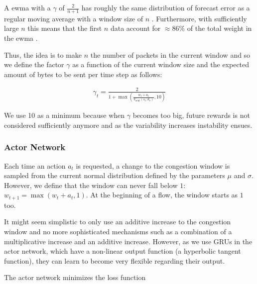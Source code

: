 \documentclass[sigconf]{acmart}
\newcommand\givenbase[1][]{\:#1\lvert\:}
\let\given\givenbase
\begin{document}
A ewma with a $\gamma$ of $\frac{2}{n+1}$ has roughly the same distribution of forecast error as a regular moving average with a window size of $n$ \cite{nahmias_production_2009}. Furthermore, with sufficiently large $n$ this means that the first $n$ data account for $\approx 86\%$ of the total weight in the ewma \cite{boissard_applications_2012}.

Thus, the idea is to make $n$ the number of packets in the current window and so we define the factor $\gamma$ as a function of the current window size and the expected amount of bytes to be sent per time step as follows:

\begin{align*}
\gamma_t = \frac{2}{1+\max(\frac{w_t+a_t}{V_\text{sent}(s_t; \theta_\text{v})},10)}
\end{align*}

We use 10 as a minimum because when $\gamma$ becomes too big, future rewards is not considered sufficiently anymore and as the variability increases instability ensues. 

\subsubsection{Actor Network}
\label{subsubsec:actor}

Each time an action $a_t$ is requested, a change to the congestion window is sampled from the current normal distribution defined by the parameters $\mu$ and $\sigma$. However, we define that the window can never fall below $1$: $w_{t+1} = \max(w_t + a_t, 1)$. At the beginning of a flow, the window starts as $1$ too.  

It might seem simplistic to only use an additive increase to the congestion window and no more sophisticated mechanisms such as a combination of a multiplicative increase and an additive increase. However, as we use GRUs in the actor network, which have a non-linear output function (a hyperbolic tangent function), they can learn to become very flexible regarding their output.  

The actor network minimizes the loss function
\end{document}
